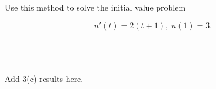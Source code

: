 Use this method to solve the initial value problem

$$
u'(t) = 2(t + 1),\; u(1) = 3.
$$

\begin{solution}\ \\\\
    \ \\
    Add 3(c) results here.
\end{solution}